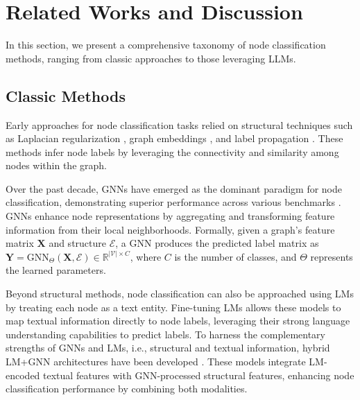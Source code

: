 \section{Related Works and Discussion}\label{sec:related_works}

In this section, we present a comprehensive taxonomy of node classification methods, ranging from classic approaches to those leveraging LLMs. 


\subsection{Classic Methods}

Early approaches for node classification tasks relied on structural techniques such as Laplacian regularization \cite{belkin2006manifold}, graph embeddings \cite{yang2016revisiting}, and label propagation \cite{zhu2003semi}. These methods infer node labels by leveraging the connectivity and similarity among nodes within the graph. 

Over the past decade, GNNs have emerged as the dominant paradigm for node classification, demonstrating superior performance across various benchmarks \cite{kipf2017GCN, velickovic2018GAT, hamilton2017SAGE, xu2018GIN}. GNNs enhance node representations by aggregating and transforming feature information from their local neighborhoods. Formally, given a graph's feature matrix $\bm{X}$ and structure $\mathcal{E}$, a GNN produces the predicted label matrix as $\bm{Y} = \text{GNN}_{\Theta}(\bm{X}, \mathcal{E}) \in \mathbb{R}^{|\mathcal{V}| \times C}$, where $C$ is the number of classes, and $\Theta$ represents the learned parameters. 

Beyond structural methods, node classification can also be approached using LMs by treating each node as a text entity. Fine-tuning LMs \cite{Liu2019roberta, reimers-2019-sentence-bert, Wang2022e5-large} allows these models to map textual information directly to node labels, leveraging their strong language understanding capabilities to predict labels. To harness the complementary strengths of GNNs and LMs, i.e., structural and textual information, hybrid LM+GNN architectures have been developed \cite{jin2023patton, zhao2022GLEM, Wen2023G2P2}. These models integrate LM-encoded textual features with GNN-processed structural features, enhancing node classification performance by combining both modalities. 


